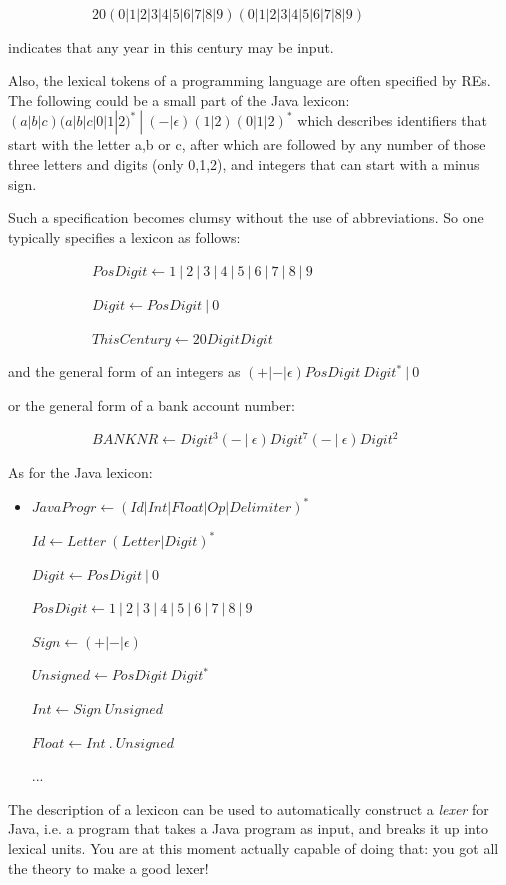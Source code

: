 ~~~~~~~~~~~~$20(0|1|2|3|4|5|6|7|8|9)(0|1|2|3|4|5|6|7|8|9)$

indicates that any year in this century may be input.

Also, the lexical tokens of a programming language are often specified
by REs. The following could be a small part of the Java lexicon:
$(a|b|c)(a|b|c|0|1|2)^*~|~(-|\epsilon)(1|2)(0|1|2)^*$ which describes
identifiers that start with the letter a,b or c, after which are
followed by any number of those three letters and digits (only 0,1,2),
and integers that can start with a minus sign.

Such a specification becomes clumsy without the use of
abbreviations. So one typically specifies a lexicon as follows:


~~~~~~~~~~~~$PosDigit \leftarrow 1~|~2~|~3~|~4~|~5~|~6~|~7~|~8~|~9$

~~~~~~~~~~~~$Digit \leftarrow PosDigit~|~0$


~~~~~~~~~~~~$ThisCentury \leftarrow 20DigitDigit$

and the general form of an integers as $(+|-|\epsilon)PosDigit~Digit^*~|~0$

or the general form of a bank account number:


~~~~~~~~~~~~$BANKNR \leftarrow Digit^3(-~|~\epsilon)Digit^7(-~|~\epsilon)Digit^2$

As for the Java lexicon:


\begin{itemize}
\item[]
$JavaProgr \leftarrow (Id|Int|Float|Op|Delimiter)^*$

$Id \leftarrow Letter~(Letter|Digit)^*$

$Digit \leftarrow PosDigit~|~0$

$PosDigit \leftarrow 1~|~2~|~3~|~4~|~5~|~6~|~7~|~8~|~9$

$Sign \leftarrow (+|-|\epsilon)$

$Unsigned \leftarrow PosDigit~Digit^*$

$Int \leftarrow Sign~Unsigned$

$Float \leftarrow Int~.~Unsigned$

...
\end{itemize}

\label{flexlabel}
The description of a lexicon can be used to automatically construct a
{\em lexer} for Java, i.e. a program that takes a Java program as input,
and breaks it up into lexical units. You are at this moment actually
capable of doing that: you got all the theory to make a good lexer!

